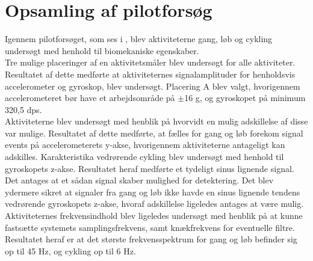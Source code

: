 \section{Opsamling af pilotforsøg}
Igennem pilotforsøget, som ses i , blev aktiviteterne gang, løb og cykling undersøgt med henhold til biomekaniske egenskaber. \\
Tre mulige placeringer af en aktivitetsmåler blev undersøgt for alle aktiviteter. Resultatet af dette medførte at aktiviteternes signalamplituder for henholdsvis accelerometer og gyroskop, blev undersøgt. Placering A blev valgt, hvorigennem accelerometeret bør have et arbejdsområde på $\pm$16 g, og gyroskopet på minimum 320,5 dps. \\
Aktiviteterne blev undersøgt med henblik på hvorvidt en mulig adskillelse af disse var mulige. Resultatet af dette medførte, at fælles for gang og løb forekom signal events på accelerometerets y-akse, hvorigennem aktiviteterne antageligt kan adskilles. Karakteristika vedrørende cykling blev undersøgt med henhold til gyroskopets z-akse. Resultatet heraf medførte et tydeligt sinus lignende signal. Det antages at et sådan signal skaber mulighed for detektering. Det blev ydermere sikret at signaler fra gang og løb ikke havde en sinus lignende tendens vedrørende gyroskopets z-akse, hvoraf adskillelse ligeledes antages at være mulig. \\
Aktiviteternes frekvensindhold blev ligeledes undersøgt med henblik på at kunne fastsætte systemets samplingsfrekvens, samt knækfrekvens for eventuelle filtre. Resultatet heraf er at det største frekvensspektrum for gang og løb befinder sig op til 45 Hz, og cykling op til 6 Hz. 


